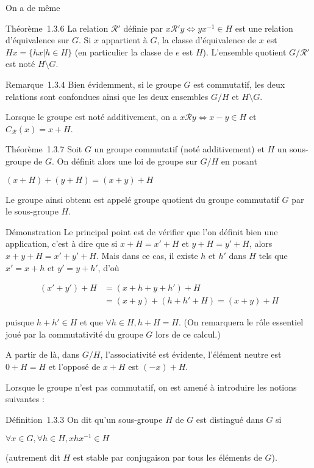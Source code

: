 On a de même

Théorème~1.3.6 La relation $\mathcal{R}'$ définie par $x \mathcal{R}' y
\Leftrightarrow yx^{-1} \in H$ est une relation
d'équivalence sur $G$. Si $x$ appartient à $G$, la classe d'équivalence de $x$
est $Hx = \{hx | h \in H\}$ (en particulier la classe de $e$ est $H$). L'ensemble
quotient $G/\mathcal{R}'$ est noté $H \setminus G$.

Remarque~1.3.4 Bien évidemment, si le groupe $G$ est commutatif, les deux
relations sont confondues ainsi que les deux ensembles $G/H$ et $H \setminus G$.

Lorsque le groupe est noté additivement, on a $x \mathcal{R} y
\Leftrightarrow x - y \in H$ et $C_\mathcal{R}(x) = x + H$.

Théorème~1.3.7 Soit $G$ un groupe commutatif (noté additivement) et $H$ un
sous-groupe de $G$. On définit alors une loi de groupe sur $G/H$ en posant

$(x + H) + (y + H) = (x + y) + H$

Le groupe ainsi obtenu est appelé groupe quotient du groupe commutatif $G$
par le sous-groupe $H$.

Démonstration Le principal point est de vérifier que l'on définit bien
une application, c'est à dire que si $x + H = x' + H$ et $y + H = y' + H$,
alors $x + y + H = x' + y' + H$. Mais dans ce cas, il existe $h$ et $h'$ dans
$H$ tels que $x' = x + h$ et $y' = y + h'$, d'où

\begin{align*} 
(x' + y') + H &= (x + h + y + h') + H \\
&= (x + y) + (h + h' + H) = (x + y) + H
\end{align*}

puisque $h + h' \in H$ et que $\forall h \in H, h + H = H$.
(On remarquera le rôle essentiel joué par la commutativité du groupe $G$
lors de ce calcul.)

A partir de là, dans $G/H$, l'associativité est évidente, l'élément neutre
est $0 + H = H$ et l'opposé de $x + H$ est $(-x) + H$.

Lorsque le groupe n'est pas commutatif, on est amené à introduire les
notions suivantes :

Définition~1.3.3 On dit qu'un sous-groupe $H$ de $G$ est distingué dans $G$ si

$\forall x \in G, \forall h \in H,
xhx^{-1} \in H$

(autrement dit $H$ est stable par conjugaison par tous les éléments de $G$).

